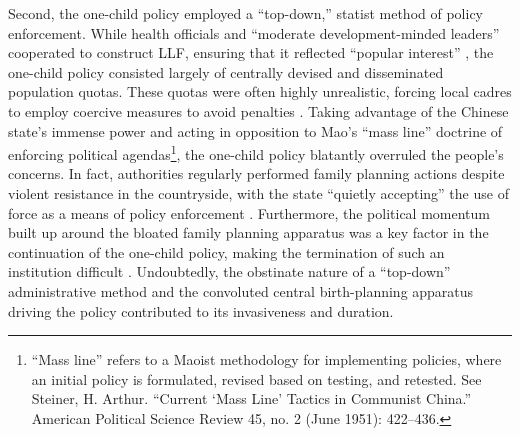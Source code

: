 Second, the one-child policy employed a “top-down,” statist method of policy enforcement. While health officials and “moderate development-minded leaders” cooperated to construct LLF, ensuring that it reflected “popular interest” \autocite[p.\ 66]{Greenhalgh2008JustOneChild}, the one-child policy consisted largely of centrally devised and disseminated population quotas. These quotas were often highly unrealistic, forcing local cadres to employ coercive measures to avoid penalties \autocite[pp.\ 155, 164]{LiXiaorong2015LicenseToCoerce}. Taking advantage of the Chinese state’s immense power and acting in opposition to Mao’s “mass line” doctrine of enforcing political agendas\footnote{“Mass line” refers to a Maoist methodology for implementing policies, where an initial policy is formulated, revised based on testing, and retested. See Steiner, H. Arthur. “Current ‘Mass Line’ Tactics in Communist China.” American Political Science Review 45, no. 2 (June 1951): 422–436.}, the one-child policy blatantly overruled the people’s concerns. In fact, authorities regularly performed family planning actions despite violent resistance in the countryside, with the state “quietly accepting” the use of force as a means of policy enforcement \autocite[p.\ 166]{Greenhalgh2008JustOneChild}. Furthermore, the political momentum built up around the bloated family planning apparatus was a key factor in the continuation of the one-child policy, making the termination of such an institution difficult \autocite[p.\ 126]{FengCaiGu2013}. Undoubtedly, the obstinate nature of a “top-down” administrative method and the convoluted central birth-planning apparatus driving the policy contributed to its invasiveness and duration. 

